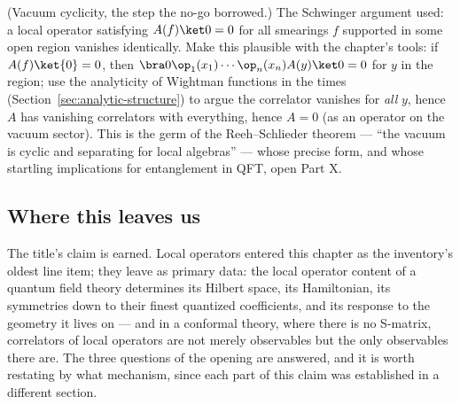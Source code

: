 \begin{exercise}[thinker]
\label{exr:reeh-schlieder}
(Vacuum cyclicity, the step the no-go borrowed.) The Schwinger argument used:
a local operator satisfying $A(f)\ket 0 = 0$ for all smearings $f$ supported
in some open region vanishes identically. Make this plausible with the
chapter's tools: if $A(f)\ket{0} = 0$, then $\bra 0 \op_1(x_1)\cdots
\op_n(x_n) A(y)\ket 0 = 0$ for $y$ in the region; use the analyticity of
Wightman functions in the times (Section~\ref{sec:analytic-structure}) to
argue the correlator vanishes for \emph{all} $y$, hence $A$ has vanishing
correlators with everything, hence $A = 0$ (as an operator on the vacuum
sector). This is the germ of the Reeh--Schlieder theorem --- ``the vacuum is
cyclic and separating for local algebras'' --- whose precise form, and whose
startling implications for entanglement in QFT, open Part X.
\end{exercise}

\subsection{Where this leaves us}
\label{sec:ch2-closing}

The title's claim is earned. Local operators entered this chapter as the
inventory's oldest line item; they leave as primary data: the local operator
content of a quantum field theory determines its Hilbert space, its
Hamiltonian, its symmetries down to their finest quantized coefficients, and
its response to the geometry it lives on --- and in a conformal theory, where
there is no S-matrix, correlators of local operators are not merely
observables but the only observables there are. The three questions of the
opening are answered, and it is worth restating by what mechanism, since
each part of this claim was established in a different section.

